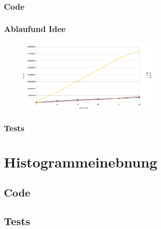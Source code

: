 \documentclass[12pt,german]{article}
\begin{document}
\subsubsection{Code}

\subsubsection{Ablaufund Idee}
\begin{figure}[h]
	\includegraphics[width=7cm]{TimeEvaluationGraph.jpg}
\end{figure}


\subsubsection{Tests}

\newpage
\section{Histogrammeinebnung  }
\subsection{Code}

\subsection{Tests}


\newpage
\end{document}
